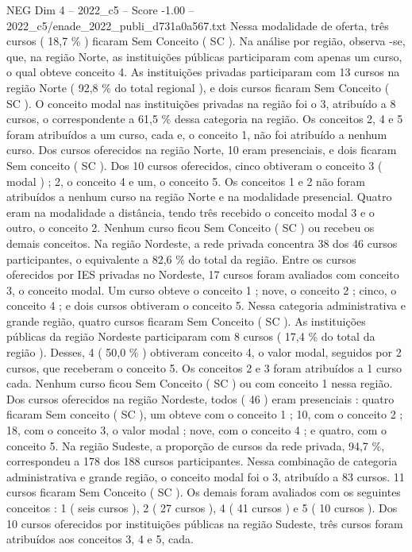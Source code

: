\begin{textsample}{NEG Dim 4 – 2022\_c5 – Score -1.00 – 2022\_c5/enade\_2022\_publi\_d731a0a567.txt}
Nessa modalidade de oferta, três cursos ( 18,7 \% ) ficaram Sem Conceito ( SC ).
Na análise por região, observa -se, que, na região Norte, as instituições públicas participaram com apenas um curso, o qual obteve conceito 4.
As instituições privadas participaram com 13 cursos na região Norte ( 92,8 \% do total regional ), e dois cursos ficaram Sem Conceito ( SC ).
O conceito modal nas instituições privadas na região foi o 3, atribuído a 8 cursos, o correspondente a 61,5 \% dessa categoria na região.
Os conceitos 2, 4 e 5 foram atribuídos a um curso, cada e, o conceito 1, não foi atribuído a nenhum curso.
Dos cursos oferecidos na região Norte, 10 eram presenciais, e dois ficaram Sem conceito ( SC ).
Dos 10 cursos oferecidos, cinco obtiveram o conceito 3 ( modal ) ; 2, o conceito 4 e um, o conceito 5.
Os conceitos 1 e 2 não foram atribuídos a nenhum curso na região Norte e na modalidade presencial.
Quatro eram na modalidade a distância, tendo três recebido o conceito modal 3 e o outro, o conceito 2.
Nenhum curso ficou Sem Conceito ( SC ) ou recebeu os demais conceitos.
Na região Nordeste, a rede privada concentra 38 dos 46 cursos participantes, o equivalente a 82,6 \% do total da região.
Entre os cursos oferecidos por IES privadas no Nordeste, 17 cursos foram avaliados com conceito 3, o conceito modal.
Um curso obteve o conceito 1 ; nove, o conceito 2 ; cinco, o conceito 4 ; e dois cursos obtiveram o conceito 5.
Nessa categoria administrativa e grande região, quatro cursos ficaram Sem Conceito ( SC ).
As instituições públicas da região Nordeste participaram com 8 cursos ( 17,4 \% do total da região ).
Desses, 4 ( 50,0 \% ) obtiveram conceito 4, o valor modal, seguidos por 2 cursos, que receberam o conceito 5.
Os conceitos 2 e 3 foram atribuídos a 1 curso cada.
Nenhum curso ficou Sem Conceito ( SC ) ou com conceito 1 nessa região.
Dos cursos oferecidos na região Nordeste, todos ( 46 ) eram presenciais : quatro ficaram Sem conceito ( SC ), um obteve com o conceito 1 ; 10, com o conceito 2 ; 18, com o conceito 3, o valor modal ; nove, com o conceito 4 ; e quatro, com o conceito 5.
Na região Sudeste, a proporção de cursos da rede privada, 94,7 \%, correspondeu a 178 dos 188 cursos participantes.
Nessa combinação de categoria administrativa e grande região, o conceito modal foi o 3, atribuído a 83 cursos. 11 cursos ficaram Sem Conceito ( SC ).
Os demais foram avaliados com os seguintes conceitos : 1 ( seis cursos ), 2 ( 27 cursos ), 4 ( 41 cursos ) e 5 ( 10 cursos ).
Dos 10 cursos oferecidos por instituições públicas na região Sudeste, três cursos foram atribuídos aos conceitos 3, 4 e 5, cada.

\end{textsample}
